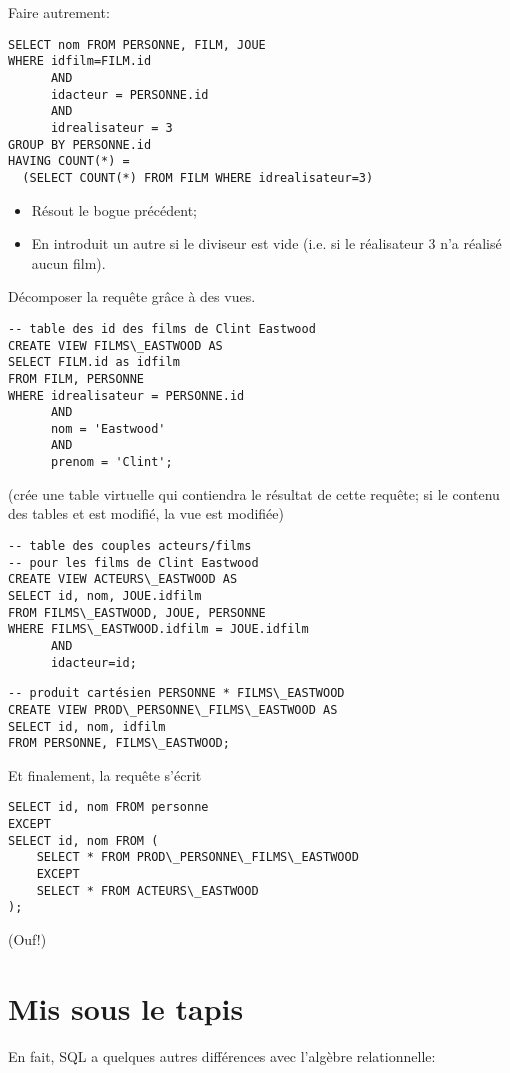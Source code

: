 Faire autrement:
\begin{Verbatim}
SELECT nom FROM PERSONNE, FILM, JOUE
WHERE idfilm=FILM.id 
      AND 
      idacteur = PERSONNE.id
      AND 
      idrealisateur = 3
GROUP BY PERSONNE.id
HAVING COUNT(*) =
  (SELECT COUNT(*) FROM FILM WHERE idrealisateur=3)
\end{Verbatim}
\begin{itemize}
\item Résout le bogue précédent;
\item En introduit un autre si le diviseur est vide (i.e. si le
  réalisateur $3$ n'a réalisé aucun film).
\end{itemize}

Décomposer la requête grâce à des vues.
\begin{Verbatim}
-- table des id des films de Clint Eastwood
CREATE VIEW FILMS\_EASTWOOD AS
SELECT FILM.id as idfilm
FROM FILM, PERSONNE
WHERE idrealisateur = PERSONNE.id
      AND 
      nom = 'Eastwood' 
      AND 
      prenom = 'Clint';
\end{Verbatim}
(crée une table virtuelle qui contiendra le résultat de cette requête;
si le contenu des tables \FILM{} et \PERSONNE{} est modifié, la vue
est modifiée)

\begin{Verbatim}
-- table des couples acteurs/films
-- pour les films de Clint Eastwood 
CREATE VIEW ACTEURS\_EASTWOOD AS
SELECT id, nom, JOUE.idfilm
FROM FILMS\_EASTWOOD, JOUE, PERSONNE
WHERE FILMS\_EASTWOOD.idfilm = JOUE.idfilm
      AND 
      idacteur=id;
\end{Verbatim}

\begin{Verbatim}
-- produit cartésien PERSONNE * FILMS\_EASTWOOD
CREATE VIEW PROD\_PERSONNE\_FILMS\_EASTWOOD AS
SELECT id, nom, idfilm
FROM PERSONNE, FILMS\_EASTWOOD;
\end{Verbatim}

Et finalement, la requête s'écrit
\begin{Verbatim}
SELECT id, nom FROM personne
EXCEPT
SELECT id, nom FROM (
    SELECT * FROM PROD\_PERSONNE\_FILMS\_EASTWOOD
    EXCEPT
    SELECT * FROM ACTEURS\_EASTWOOD
);
\end{Verbatim}

(Ouf!)
\normalsize

\section{Mis sous le tapis}
En fait, SQL a quelques autres différences avec l'algèbre
relationnelle:

